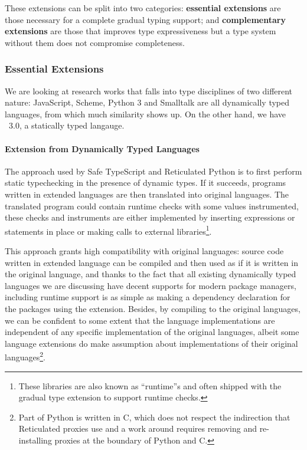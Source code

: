 These extensions can be split into two categories:
\textbf{essential extensions} are those necessary
for a complete gradual typing support;
and \textbf{complementary extensions} are those that improves type expressiveness
but a type system without them does not compromise completeness.

\subsubsection{Essential Extensions}

We are looking at research works that falls into type disciplines of two different nature:
JavaScript, Scheme, Python 3 and Smalltalk are all dynamically typed languages, from which
much similarity shows up.
On the other hand, we have \csharp\ 3.0, a statically
typed langauge.

\paragraph{Extension from Dynamically Typed Languages}

The approach used by Safe TypeScript and Reticulated Python
is to first perform static typechecking in the presence of dynamic types.
If it succeeds, programs written in extended languages are then translated into original languages.
The translated program could contain runtime checks with some values instrumented,
these checks and instruments are either implemented by inserting expressions or statements in place or
making calls to external libraries\footnote{
	These libraries are also known as ``runtime''s
	and often shipped
	with the gradual type extension to support
	runtime checks.
}.

This approach grants high compatibility with original languages: source code written in extended language
can be compiled and then used as if it is written in the original language, and thanks to the fact
that all existing dynamically typed languages
we are discussing have decent supports for modern package managers,
including runtime support is as simple as making a dependency declaration
for the packages using the extension.
Besides, by compiling to the original languages,
we can be confident to some extent that the language implementations
are independent of any specific implementation of the original languages,
albeit some language extensions do make assumption about implementations of their original languages\footnote{
	Part of Python is written in C, which does not respect the indirection that
	Reticulated proxies use and a work around requires removing and re-installing
	proxies at the boundary of Python and C\cite{vitousek2014design}.
}.

